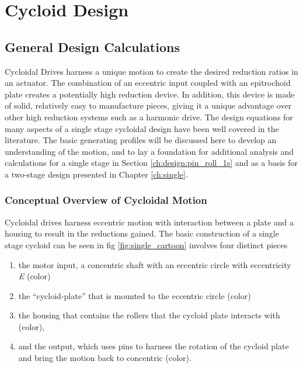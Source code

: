 
\chapter{Cycloid Design}\label{ch:design_1s}


\section{General Design Calculations} \label{ch:design:basic_calc}

Cycloidal Drives harness a unique motion to create the desired reduction ratios in an actuator. The combination of an eccentric input coupled with an epitrochoid plate creates a potentially high reduction device. In addition, this device is made of solid, relatively easy to manufacture pieces, giving it a unique advantage over other high reduction systems such as a harmonic drive. The design equations for many aspects of a single stage cycloidal design have been well covered in the literature. The basic generating profiles will be discussed here to develop an understanding of the motion, and to lay a foundation for additional analysis and calculations for a single stage in Section \ref{ch:design:pin_roll_1s} and as a basis for a two-stage design presented in Chapter \ref{ch:single}. 

\subsection{Conceptual Overview of Cycloidal Motion} \label{ch:design:basic_calc:overview}

Cycloidal drives harness eccentric motion with interaction between a plate and a housing to result in the reductions gained. The basic construction of a single stage cycloid can be seen in fig \ref{fig:single_cartoon} involves four distinct pieces
\begin{enumerate}
	\item the motor input, a concentric shaft with an eccentric circle with eccentricity \textit{E} (color)
	\item the ``cycloid-plate'' that is mounted to the eccentric circle (color)
	\item the housing that contains the rollers that the cycloid plate interacts with (color),
	\item and the output, which uses pins to harness the rotation of the cycloid plate and bring the motion back to concentric (color).
\end{enumerate}

